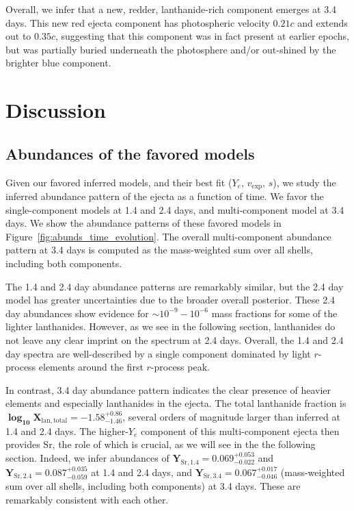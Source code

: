 \documentclass[twocolumn,twocolappendix]{aastex63}
\begin{document}
Overall, we infer that a new, redder, lanthanide-rich component emerges  at 3.4 days. This new red ejecta component has photospheric velocity $0.21c$ and extends out to $0.35c$, suggesting that this component was in fact present at earlier epochs, but was partially buried underneath the photosphere and/or out-shined by the brighter blue component.






\section{Discussion}\label{sec:disco}

\subsection{Abundances of the favored models}\label{ssc:disco-abundances}

Given our favored inferred models, and their best fit ($Y_e$, $v_{\mathrm{exp}}$, $s$), we study the inferred abundance pattern of the ejecta as a function of time. We favor the single-component models at 1.4 and 2.4 days, and multi-component model at 3.4 days. We show the abundance patterns of these favored models in Figure~\ref{fig:abunds_time_evolution}. The overall multi-component abundance pattern at 3.4 days is computed as the mass-weighted sum over all shells, including both components. 

The 1.4 and 2.4 day abundance patterns are remarkably similar, but the 2.4 day model has greater uncertainties due to the broader overall posterior. These 2.4 day abundances show evidence for $\sim 10^{-9} - 10^{-6}$ mass fractions for some of the lighter lanthanides. However, as we see in the following section, lanthanides do not leave any clear imprint on the spectrum at 2.4 days. Overall, the 1.4 and 2.4 day spectra are well-described by a single component dominated by light $r$-process elements around the first $r$-process peak.

In contrast,  3.4 day abundance pattern indicates the clear presence of heavier elements and especially lanthanides in the ejecta. The total lanthanide fraction is $\mathbf{\log_{10} X_{\mathrm{lan,total}} = -1.58^{+0.86}_{-1.46}}$, several orders of magnitude larger than inferred at 1.4 and 2.4 days. The higher-$Y_e$ component of this multi-component ejecta then provides Sr, the role of which is crucial, as we will see in the the following section. Indeed, we infer abundances of $\mathbf{Y_{\mathrm{Sr},1.4} = 0.069^{+0.053}_{-0.022}}$ and $\mathbf{Y_{\mathrm{Sr},2.4} = 0.087^{+0.035}_{-0.059}}$ at 1.4 and 2.4 days, and $\mathbf{Y_{\mathrm{Sr},3.4} = 0.067^{+0.017}_{-0.046}}$ (mass-weighted sum over all shells, including both components) at 3.4 days. These are remarkably consistent with each other.
\end{document}

